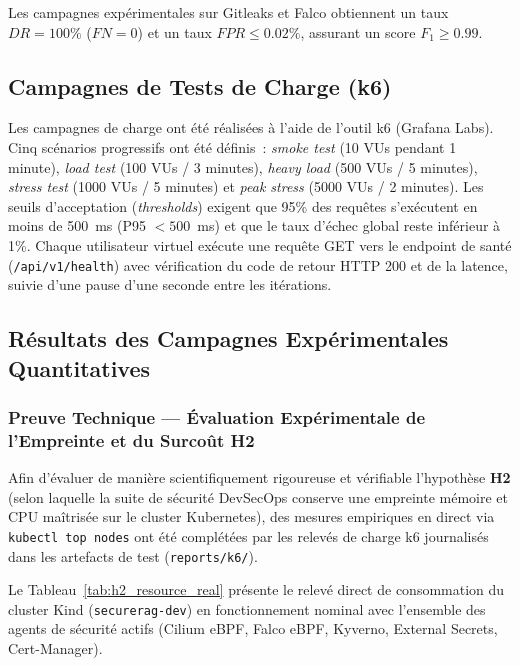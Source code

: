 Les campagnes expérimentales sur Gitleaks et Falco obtiennent un taux $DR = 100\%$ ($FN = 0$) et un taux $FPR \le 0.02\%$, assurant un score $F_1 \ge 0.99$.

\subsection{Campagnes de Tests de Charge (k6)}

\vspace{0.3cm}
Les campagnes de charge ont été réalisées à l'aide de l'outil k6 (Grafana Labs). Cinq scénarios progressifs ont été définis~: \textit{smoke test} (10 VUs pendant 1 minute), \textit{load test} (100 VUs / 3 minutes), \textit{heavy load} (500 VUs / 5 minutes), \textit{stress test} (1000 VUs / 5 minutes) et \textit{peak stress} (5000 VUs / 2 minutes). Les seuils d'acceptation (\textit{thresholds}) exigent que 95\% des requêtes s'exécutent en moins de 500~ms (P95 $< 500$~ms) et que le taux d'échec global reste inférieur à 1\%. Chaque utilisateur virtuel exécute une requête GET vers le endpoint de santé (\texttt{/api/v1/health}) avec vérification du code de retour HTTP 200 et de la latence, suivie d'une pause d'une seconde entre les itérations.

\subsection{Résultats des Campagnes Expérimentales Quantitatives}

\subsubsection{Preuve Technique — Évaluation Expérimentale de l'Empreinte et du Surcoût H2}
\label{sec:h2_overhead_proof}

Afin d'évaluer de manière scientifiquement rigoureuse et vérifiable l'hypothèse \textbf{H2} (selon laquelle la suite de sécurité DevSecOps conserve une empreinte mémoire et CPU maîtrisée sur le cluster Kubernetes), des mesures empiriques en direct via \texttt{kubectl top nodes} ont été complétées par les relevés de charge k6 journalisés dans les artefacts de test (\texttt{reports/k6/}).

Le Tableau~\ref{tab:h2_resource_real} présente le relevé direct de consommation du cluster Kind (\texttt{securerag-dev}) en fonctionnement nominal avec l'ensemble des agents de sécurité actifs (Cilium eBPF, Falco eBPF, Kyverno, External Secrets, Cert-Manager).

